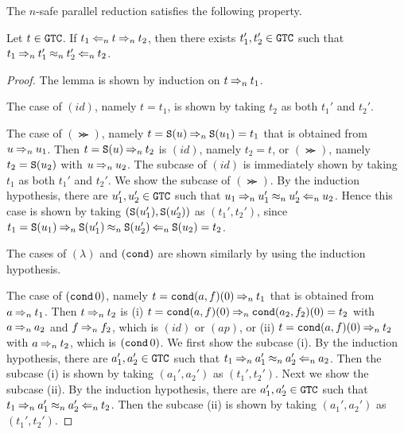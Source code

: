 The $n$-safe parallel reduction satisfies the following  property. 
\begin{lemma}\label{lem:parallel_pentagon}
  Let $t \in {\tt GTC}$.
  If $t_1 \mathbin{\Leftarrow_{n}} t \mathbin{\Rightarrow_{n}} t_2$,
  then there exists $t_1',t_2'\in {\tt GTC}$ such that $t_1 \mathbin{\Rightarrow_{n}} t_1' \mathbin{\approx_{n}} t_2' \mathbin{\Leftarrow_{n}} t_2$.
\end{lemma}
\begin{proof}
  The lemma is shown by induction on $t \mathbin{\Rightarrow_{n}} t_1$. 

  The case of $(id)$, namely $t=t_1$, is shown by taking $t_2$ as both $t_1'$ and $t_2'$. 
  
  The case of $(\Succ)$, namely $t={\tt S}(u) \mathbin{\Rightarrow_{n}} {\tt S}(u_1)=t_1$ that is obtained
  from $u \mathbin{\Rightarrow_{n}} u_1$.
  Then $t={\tt S}(u) \mathbin{\Rightarrow_{n}} t_2$ is $(id)$, namely $t_2 = t$, or 
  $(\Succ)$, namely $t_2={\tt S}(u_2)$ with $u \mathbin{\Rightarrow_{n}} u_2$.
  The subcase of $(id)$ is immediately shown by taking $t_1$ as both $t_1'$ and $t_2'$. 
  We show the subcase of $(\Succ)$.
  By the induction hypothesis, there are $u_1', u_2' \in {\tt GTC}$ such that
  $u_1 \mathbin{\Rightarrow_{n}} u_1' \mathbin{\approx_{n}} u_2' \mathbin{\Leftarrow_{n}} u_2$.
  Hence this case is shown by taking $({\tt S}(u_1'),{\tt S}(u_2'))$ as $(t_1',t_2')$, 
  since $t_1 = {\tt S}(u_1) \mathbin{\Rightarrow_{n}} {\tt S}(u_1') \mathbin{\approx_{n}} {\tt S}(u_2') \mathbin{\Leftarrow_{n}} {\tt S}(u_2) = t_2$.
  
  The cases of $(\lambda)$ and $({\tt cond})$ are shown similarly by using the induction hypothesis.  

  The case of $({\tt cond}\,0)$, namely $t = {\tt cond}(a,f)(0) \mathbin{\Rightarrow_{n}} t_1$ that is
  obtained from $a \mathbin{\Rightarrow_{n}} t_1$.
  Then $t \mathbin{\Rightarrow_{n}} t_2$ is
  (i) $t={\tt cond}(a,f)(0) \mathbin{\Rightarrow_{n}} {\tt cond}(a_2,f_2)(0) = t_2$
  with $a \mathbin{\Rightarrow_{n}} a_2$ and $f \mathbin{\Rightarrow_{n}} f_2$, which is $(id)$ or $(ap)$, or
  (ii) $t={\tt cond}(a,f)(0) \mathbin{\Rightarrow_{n}} t_2$ with $a \mathbin{\Rightarrow_{n}} t_2$, which is $({\tt cond}\,0)$. 
  We first show the subcase (i).
  By the induction hypothesis, there are $a_1', a_2' \in {\tt GTC}$ such that
  $t_1 \mathbin{\Rightarrow_{n}} a_1' \mathbin{\approx_{n}} a_2' \mathbin{\Leftarrow_{n}} a_2$.
  Then the subcase (i) is shown by taking $(a_1',a_2')$ as $(t_1',t_2')$. 
  Next we show the subcase (ii). 
  By the induction hypothesis, there are $a_1', a_2' \in {\tt GTC}$ such that
  $t_1 \mathbin{\Rightarrow_{n}} a_1' \mathbin{\approx_{n}} a_2' \mathbin{\Leftarrow_{n}} t_2$.
  Then the subcase (ii) is shown by taking $(a_1',a_2')$ as $(t_1',t_2')$. 


\end{proof}
